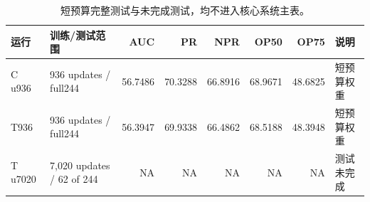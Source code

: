 \documentclass[journal]{IEEEtran}
\begin{document}
\begin{table}[t]
\centering
\caption{短预算完整测试与未完成测试，均不进入核心系统主表。}
\label{tab:partial}
\small
\setlength{\tabcolsep}{3pt}
\begin{tabular}{@{}llrrrrrl@{}}
\toprule
运行 & 训练/测试范围 & AUC & PR & NPR & OP50 & OP75 & 说明\\
\midrule
C u936 & 936 updates / full244 & 56.7486 & 70.3288 & 66.8916 & 68.9671 & 48.6825 & 短预算权重\\
T936 & 936 updates / full244 & 56.3947 & 69.9338 & 66.4862 & 68.5188 & 48.3948 & 短预算权重\\
T u7020 & 7,020 updates / 62 of 244 & NA & NA & NA & NA & NA & 测试未完成\\
\bottomrule
\end{tabular}
\end{table}

\balance


\end{document}

